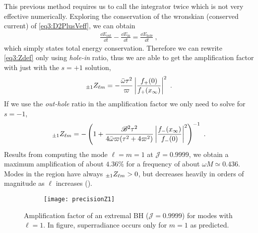This previous method requires us to call the integrator twice which is not very effective numerically.
Exploring the conservation of the wronskian (conserved current) of \eqref{eq3:D2PlusVeff}, we can obtain
\begin{align}
	\label{eq4:InOutHole}
	\frac{\dd E_\mathrm{out}}{\dd t} - \frac{\dd E_\mathrm{in}}{\dd t} = \frac{\dd E_\mathrm{hole}}{\dd t} ~,
\end{align}
which simply states total energy conservation.
Therefore we can rewrite \eqref{eq3:Zdef} only using \emph{hole-in} ratio, thus we are able to get the amplification factor with just with the $s=+1$ solution,
\begin{align}
	\label{eq4:ZFPlusPlus}
	\uu[\pm 1]{Z}{\ell m} = - \frac{\bar{\omega} \tau^2}{\varpi} \left|\frac{f_{+}(0)}{f_{+}(x_\infty)}\right|^2 ~.
\end{align}
If we use the \emph{out-hole} ratio in the amplification factor we only need to solve for $s=-1$,
\begin{align}
	\label{eq4:ZFMinusMinus}
	\uu[\pm 1]{Z}{\ell m} = - \left( 1 + \frac{\mathscr{B}^2 \tau^2}{4 \bar{\omega} \varpi(\tau^2 + 4 \varpi^2)} \left|\frac{f_{-}(x_\infty)}{f_{-}(0)}\right|^2 \right)^{-1} ~.
\end{align}
Results from computing the mode $\ell=m=1$ at $\mathscr{J}=0.9999$, we obtain a maximum amplification of about $4.36\%$ for a frequency of about $\omega M \simeq 0.436$.
Modes in the region  have always $\uu[\pm 1]{Z}{\ell m}>0$, but decreases heavily in orders of magnitude as $\ell$ increases ().
\begin{figure}[h]
	\centering
	\vspace{0.2cm}
	\begin{subfigure}[c]{0.6\textwidth}
        \texttt{[image: precisionZ1]}
	\end{subfigure}
	\caption{Amplification factor of an extremal BH ($\mathscr{J}=0.9999$) for modes with $\ell=1$. In figure, superradiance occurs only for $m=1$ as predicted.}
	\label{fig4:plotZ53}
\end{figure}


